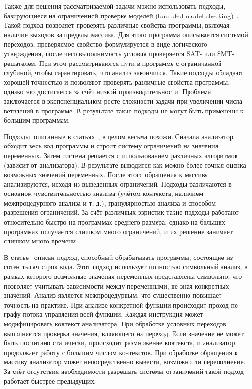 Также для решения рассматриваемой задачи можно использовать подходы,
базирующиеся на ограниченной проверке моделей (bounded model
checking)~\cite{cordeiro2012smt, merz2012llbmc}. Такой подход
позволяет проверять различные свойства программы, включая наличие
выходов за пределы массива. Для этого программа описывается системой
переходов, проверяемое свойство формулируется в виде логического
утверждения, после чего выполнимость условия проверяется SAT- или
SMT-решателем. При этом рассматриваются пути в программе с
ограниченной глубиной, чтобы гарантировать, что анализ
закончится. Такие подходы обладают хорошей точностью и позволяют
проверять различные свойства программы, однако это достигается за счёт
низкой производительности. Проблема заключается в экспоненциальном
росте сложности задачи при увеличении числа ветвлений в программе. В
результате такие подходы не могут быть применены к большим программам.

Подходы, описанные в статьях~\cite{wagner2000first,
  ganapathy2003buffer, larochelle2001statically}, в целом весьма
похожи. Сначала анализатор обходит весь код программы и строит систему
ограничений на значения переменных. Затем система решается с
использованием различных алгоритмов (зависит от анализатора). В
результате выводится как можно более точная оценка возможных значений
переменных. После этого обращения к массиву анализируются, исходя из
выведенных ограничений. Подходы различаются в основном
чувствительностью анализа (учётом контекста, наличием межпроцедурного
анализа и т. д.), гранулярностью анализа и способом разрешения
ограничений. За счёт различных эвристик такие подходы работают
относительно быстро на программах среднего размера, однако на больших
программах получается слишком много ограничений, и их решение занимает
слишком много времени.

В статье~\cite{xie2003archer} описан подход, способный обрабатывать
программы, состоящие из сотен тысяч строк кода. Этот подход использует
полностью символьный анализ, в рамках которого возможные значения
переменных представлены символьно, что позволяет учитывать зависимости
между переменными, не зная конкретных значений. Анализ является
межпроцедурным, что существенно повышает точность на практике. При
анализе конкретной функции происходит проход по графу потока
управления всей функции. Каждая инструкция может модифицировать
контекст анализатора. При обработке условных переходов выполняется
проверка значения, влияющего на переход. Если значение не может быть
посчитано статически, происходит размножение контекста, и анализатор
продолжает работу с большим числом контекстов. При обработке обращения
к массиву анализатор может непосредственно вывести, возможно ли
переполнение. За счёт отсутствия необходимости разрешать системы
ограничений такой подход работает быстрее предыдущих.


